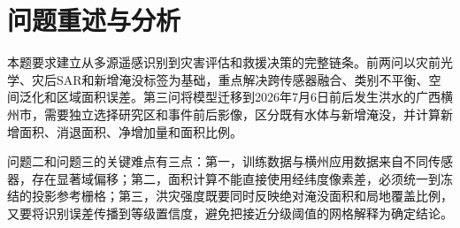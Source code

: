 \section{问题重述与分析}

本题要求建立从多源遥感识别到灾害评估和救援决策的完整链条。前两问以灾前光学、灾后SAR和新增淹没标签为基础，重点解决跨传感器融合、类别不平衡、空间泛化和区域面积误差。第三问将模型迁移到2026年7月6日前后发生洪水的广西横州市，需要独立选择研究区和事件前后影像，区分既有水体与新增淹没，并计算新增面积、消退面积、净增加量和面积比例。

问题二和问题三的关键难点有三点：第一，训练数据与横州应用数据来自不同传感器，存在显著域偏移；第二，面积计算不能直接使用经纬度像素差，必须统一到冻结的投影参考栅格；第三，洪灾强度既要同时反映绝对淹没面积和局地覆盖比例，又要将识别误差传播到等级置信度，避免把接近分级阈值的网格解释为确定结论。
